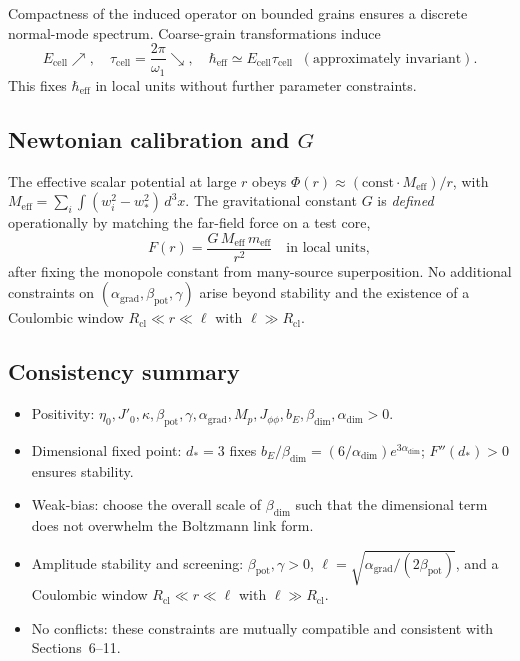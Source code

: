 \documentclass[11pt]{article}
\begin{document}
Compactness of the induced operator on bounded grains ensures a discrete normal-mode spectrum. Coarse-grain transformations induce
\begin{equation}
E_{\mathrm{cell}} \nearrow,\quad \tau_{\mathrm{cell}} = \frac{2\pi}{\omega_1} \searrow,\quad \hbar_{\mathrm{eff}} \simeq E_{\mathrm{cell}} \tau_{\mathrm{cell}} \;\; (\text{approximately invariant}).
\end{equation}
This fixes $\hbar_{\mathrm{eff}}$ in local units without further parameter constraints.

\subsection{Newtonian calibration and $G$}

The effective scalar potential at large $r$ obeys $\Phi(r) \approx (\mathrm{const}\cdot M_{\mathrm{eff}})/r$, with $M_{\mathrm{eff}}=\sum_i \int (w_i^2-w_*^2)\, d^3x$. The gravitational constant $G$ is \emph{defined} operationally by matching the far-field force on a test core,
\begin{equation}
F(r) = \frac{G\, M_{\mathrm{eff}}\, m_{\mathrm{eff}}}{r^2}\quad \text{in local units},
\end{equation}
after fixing the monopole constant from many-source superposition. No additional constraints on $(\alpha_{\mathrm{grad}},\beta_{\mathrm{pot}},\gamma)$ arise beyond stability and the existence of a Coulombic window $R_{\mathrm{cl}} \ll r \ll \ell$ with $\ell \gg R_{\mathrm{cl}}$.

\subsection{Consistency summary}

\begin{itemize}
  \item Positivity: $\eta_0, J'_0, \kappa, \beta_{\mathrm{pot}}, \gamma, \alpha_{\mathrm{grad}}, M_p, J_{\phi\phi}, b_E, \beta_{\mathrm{dim}}, \alpha_{\mathrm{dim}} > 0$.
  \item Dimensional fixed point: $d_*=3$ fixes $b_E/\beta_{\mathrm{dim}} = (6/\alpha_{\mathrm{dim}}) e^{3\alpha_{\mathrm{dim}}}$; $F''(d_*)>0$ ensures stability.
  \item Weak-bias: choose the overall scale of $\beta_{\mathrm{dim}}$ such that the dimensional term does not overwhelm the Boltzmann link form.
  \item Amplitude stability and screening: $\beta_{\mathrm{pot}},\gamma>0$, $\ell = \sqrt{\alpha_{\mathrm{grad}}/(2\beta_{\mathrm{pot}})}$, and a Coulombic window $R_{\mathrm{cl}} \ll r \ll \ell$ with $\ell \gg R_{\mathrm{cl}}$.
  \item No conflicts: these constraints are mutually compatible and consistent with Sections~6--11.
\end{itemize}
\end{document}
